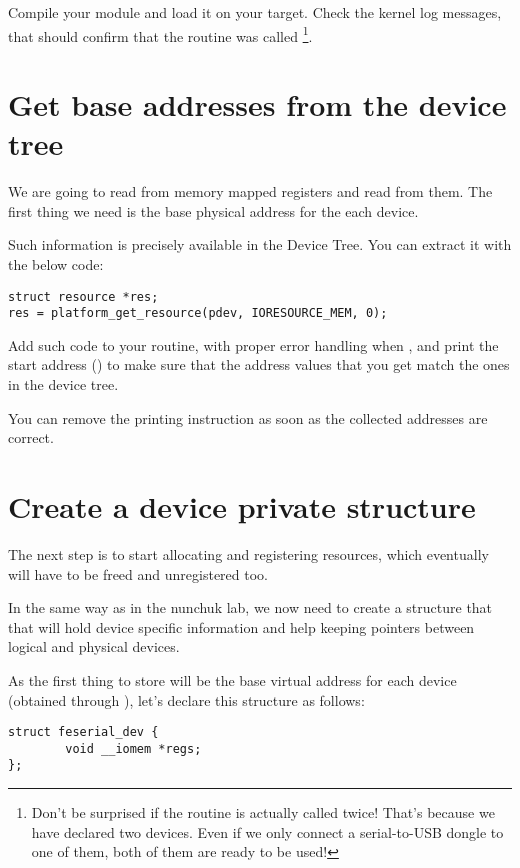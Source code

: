 Compile your module and load it on your target. Check the kernel log
messages, that should confirm that the  routine was
called \footnote{Don't be surprised if the  routine is
actually called twice! That's because we have declared two devices.
Even if we only connect a serial-to-USB dongle to one of them, both
of them are ready to be used!}.

\section{Get base addresses from the device tree}

We are going to read from memory mapped registers and read from them.
The first thing we need is the base physical address for the each
device.

Such information is precisely available in the Device Tree. You can
extract it with the below code:

\begin{verbatim}
struct resource *res;
res = platform_get_resource(pdev, IORESOURCE_MEM, 0);
\end{verbatim}

Add such code to your  routine, with proper error
handling when , and print the start address
() to make sure that the address values that
you get match the ones in the device tree. 

You can remove the printing instruction as soon as the collected
addresses are correct.

\section{Create a device private structure}

The next step is to start allocating and registering resources,
which eventually will have to be freed and unregistered too.

In the same way as in the nunchuk lab, we now need to create a
structure that that will hold device specific information and help
keeping pointers between logical and physical devices.

As the first thing to store will be the base virtual address for
each device (obtained through ), let's declare this
structure as follows:

\begin{verbatim}
struct feserial_dev {
        void __iomem *regs;
};
\end{verbatim}

